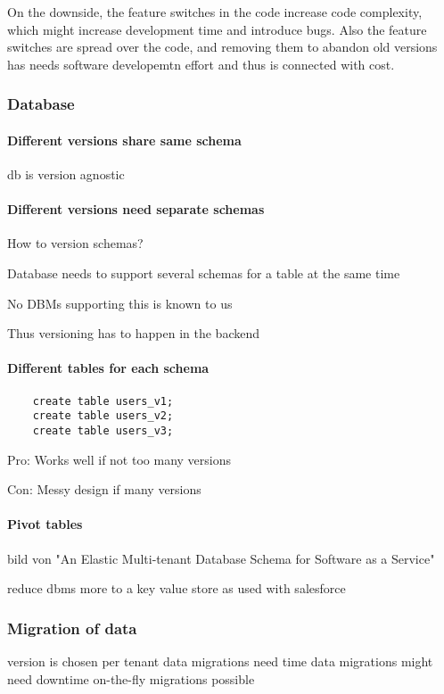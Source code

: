 On the downside, the feature switches in the code increase code complexity, which might increase development time and introduce bugs. Also the feature switches are spread over the code, and removing them to abandon old versions has needs software developemtn effort and thus is connected with cost.

%
% 
%

\subsubsection{Database}

\paragraph{Different versions share same schema}
db is version agnostic

\paragraph{Different versions need separate schemas}
How to version schemas?

  Database needs to support several schemas for a table at the same time

  No DBMs supporting this is known to us

  Thus versioning has to happen in the backend

  \paragraph{Different tables for each schema}
  \lstset{language=SQL, caption=sql, label=sql}
  \begin{lstlisting}
    create table users_v1;
    create table users_v2;
    create table users_v3;
  \end{lstlisting}

  Pro:
  Works well if not too many versions

  Con:
  Messy design if many versions


  \paragraph{Pivot tables}

  bild von "An Elastic Multi-tenant Database Schema for Software as a Service"

  reduce dbms more to a key value store
  as used with salesforce

\subsubsection{Migration of data}
  version is chosen per tenant
  data migrations need time
  data migrations might need downtime
  on-the-fly migrations possible


